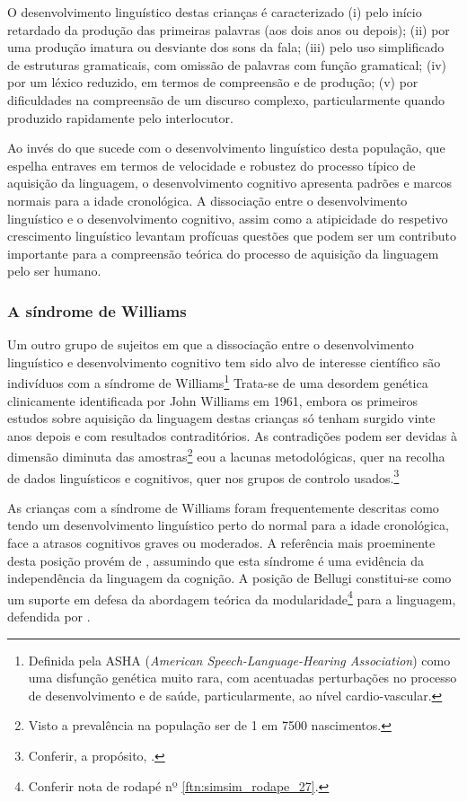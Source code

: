 \documentclass[output=paper]{LSP/langsci}
\begin{document}
O desenvolvimento linguístico destas crianças é caracterizado (i) pelo início retardado da produção das primeiras palavras (aos dois anos ou depois); (ii) por uma produção imatura ou desviante dos sons da fala; (iii) pelo uso simplificado de estruturas gramaticais, com omissão de palavras com função gramatical; (iv) por um léxico reduzido, em termos de compreensão e de produção; (v) por dificuldades na compreensão de um discurso complexo, particularmente quando produzido rapidamente pelo interlocutor.

Ao invés do que sucede com o desenvolvimento linguístico desta população, que espelha entraves em termos de velocidade e robustez do processo típico de aquisição da linguagem, o desenvolvimento cognitivo apresenta padrões e marcos normais para a idade cronológica. A dissociação entre o desenvolvimento linguístico e o desenvolvimento cognitivo, assim como a atipicidade do respetivo crescimento linguístico levantam profícuas questões que podem ser um contributo importante para a compreensão teórica do processo de aquisição da linguagem pelo ser humano.

\subsubsection{A síndrome de Williams}
\label{subsubsec:simsim_williams}
Um outro grupo de sujeitos em que a dissociação entre o desenvolvimento linguístico e desenvolvimento cognitivo tem sido alvo de interesse científico são indivíduos com a síndrome de Williams\footnote{Definida pela ASHA (\textit{American Speech-Language-Hearing Association}) como uma disfunção genética muito rara, com acentuadas perturbações no processo de desenvolvimento e de saúde, particularmente, ao nível cardio-vascular.} Trata-se de uma desordem genética clinicamente identificada por John Williams em 1961, embora os primeiros estudos sobre aquisição da linguagem destas crianças só tenham surgido vinte anos depois e com resultados contraditórios. As contradições podem ser devidas à dimensão diminuta das amostras\footnote{Visto a prevalência na população ser de 1 em 7500 nascimentos.} e\largerpage[2] ou a lacunas metodológicas, quer na recolha de dados linguísticos e cognitivos, quer nos grupos de controlo usados.\footnote{Conferir, a propósito, \citet{brock2007}.}

As crianças com a síndrome de Williams foram frequentemente descritas como tendo um desenvolvimento linguístico perto do normal para a idade cronológica, face a atrasos cognitivos graves ou moderados. A referência mais proeminente desta posição provém de \citet{bellugi_etal1988}, assumindo que esta síndrome é uma evidência da independência da linguagem da cognição. A posição de Bellugi constitui-se como um suporte em defesa da abordagem teórica da modularidade\footnote{Conferir nota de rodapé nº \ref{ftn:simsim_rodape_27}.} para a linguagem, defendida por \citet{fodor1983}.
\end{document}
